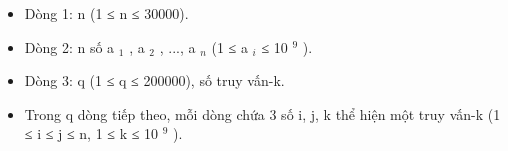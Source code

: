 \begin{itemize}
	\item     Dòng 1: n (1 ≤ n ≤ 30000).   
	\item     Dòng 2: n số a    $_     1    $    , a    $_     2    $    , ...,   a    $_     n    $    (1 ≤ a    $_     i    $    ≤   10    $^     9    $    ).   
	\item     Dòng 3: q (1 ≤ q ≤ 200000), số truy vấn-k.   
	\item     Trong q dòng tiếp theo, mỗi dòng chứa 3 số i, j, k   thể hiện một truy vấn-k (1 ≤ i ≤ j ≤ n, 1 ≤ k ≤   10    $^     9    $    ).   
\end{itemize}